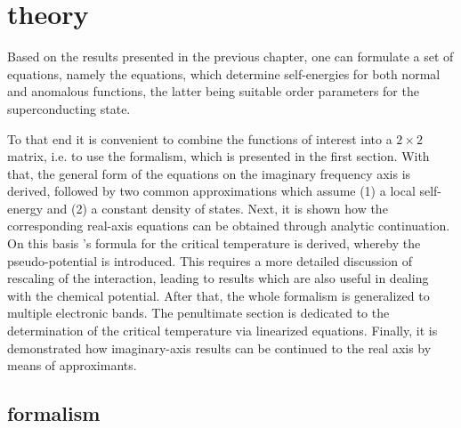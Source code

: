 
\chapter{ theory}
\label{Eliashberg theory}

Based on the results presented in the previous chapter, one can formulate a set
of equations, namely the  equations, which determine
self-energies for both normal and anomalous  functions, the latter
being suitable order parameters for the superconducting state.

To that end it is convenient to combine the  functions of interest
into a $2 \times 2$ matrix, i.e. to use the  formalism, which is
presented in the first section.\footnotemark{} With that, the general form of
the  equations on the imaginary frequency axis is derived,
followed by two common approximations which assume (1) a local self-energy and
(2) a constant density of states. Next, it is shown how the corresponding
real-axis equations can be obtained through analytic continuation. On this basis
's formula for the critical temperature is derived, whereby the
 pseudo-potential is introduced. This requires a more detailed
discussion of rescaling of the  interaction, leading to results
which are also useful in dealing with the chemical potential. After that, the
whole formalism is generalized to multiple electronic bands. The penultimate
section is dedicated to the determination of the critical temperature via
linearized  equations. Finally, it is demonstrated how
imaginary-axis results can be continued to the real axis by means of 
approximants.

\section{ formalism}

